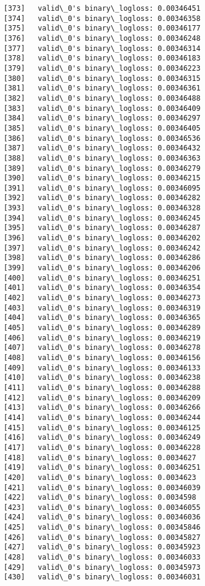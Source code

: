 \documentclass[11pt]{article}
\begin{document}
\begin{Verbatim}[commandchars=\\\{\}]
[373]	valid\_0's binary\_logloss: 0.00346451
[374]	valid\_0's binary\_logloss: 0.00346358
[375]	valid\_0's binary\_logloss: 0.00346177
[376]	valid\_0's binary\_logloss: 0.00346248
[377]	valid\_0's binary\_logloss: 0.00346314
[378]	valid\_0's binary\_logloss: 0.00346183
[379]	valid\_0's binary\_logloss: 0.00346223
[380]	valid\_0's binary\_logloss: 0.00346315
[381]	valid\_0's binary\_logloss: 0.00346361
[382]	valid\_0's binary\_logloss: 0.00346488
[383]	valid\_0's binary\_logloss: 0.00346409
[384]	valid\_0's binary\_logloss: 0.00346297
[385]	valid\_0's binary\_logloss: 0.00346405
[386]	valid\_0's binary\_logloss: 0.00346536
[387]	valid\_0's binary\_logloss: 0.00346432
[388]	valid\_0's binary\_logloss: 0.00346363
[389]	valid\_0's binary\_logloss: 0.00346279
[390]	valid\_0's binary\_logloss: 0.00346215
[391]	valid\_0's binary\_logloss: 0.00346095
[392]	valid\_0's binary\_logloss: 0.00346282
[393]	valid\_0's binary\_logloss: 0.00346328
[394]	valid\_0's binary\_logloss: 0.00346245
[395]	valid\_0's binary\_logloss: 0.00346287
[396]	valid\_0's binary\_logloss: 0.00346202
[397]	valid\_0's binary\_logloss: 0.00346242
[398]	valid\_0's binary\_logloss: 0.00346286
[399]	valid\_0's binary\_logloss: 0.00346206
[400]	valid\_0's binary\_logloss: 0.00346251
[401]	valid\_0's binary\_logloss: 0.00346354
[402]	valid\_0's binary\_logloss: 0.00346273
[403]	valid\_0's binary\_logloss: 0.00346319
[404]	valid\_0's binary\_logloss: 0.00346365
[405]	valid\_0's binary\_logloss: 0.00346289
[406]	valid\_0's binary\_logloss: 0.00346219
[407]	valid\_0's binary\_logloss: 0.00346278
[408]	valid\_0's binary\_logloss: 0.00346156
[409]	valid\_0's binary\_logloss: 0.00346133
[410]	valid\_0's binary\_logloss: 0.00346238
[411]	valid\_0's binary\_logloss: 0.00346288
[412]	valid\_0's binary\_logloss: 0.00346209
[413]	valid\_0's binary\_logloss: 0.00346266
[414]	valid\_0's binary\_logloss: 0.00346244
[415]	valid\_0's binary\_logloss: 0.00346125
[416]	valid\_0's binary\_logloss: 0.00346249
[417]	valid\_0's binary\_logloss: 0.00346228
[418]	valid\_0's binary\_logloss: 0.0034627
[419]	valid\_0's binary\_logloss: 0.00346251
[420]	valid\_0's binary\_logloss: 0.0034623
[421]	valid\_0's binary\_logloss: 0.00346039
[422]	valid\_0's binary\_logloss: 0.0034598
[423]	valid\_0's binary\_logloss: 0.00346055
[424]	valid\_0's binary\_logloss: 0.00346036
[425]	valid\_0's binary\_logloss: 0.00345846
[426]	valid\_0's binary\_logloss: 0.00345827
[427]	valid\_0's binary\_logloss: 0.00345923
[428]	valid\_0's binary\_logloss: 0.00346033
[429]	valid\_0's binary\_logloss: 0.00345973
[430]	valid\_0's binary\_logloss: 0.00346031

\end{Verbatim}
\end{document}
